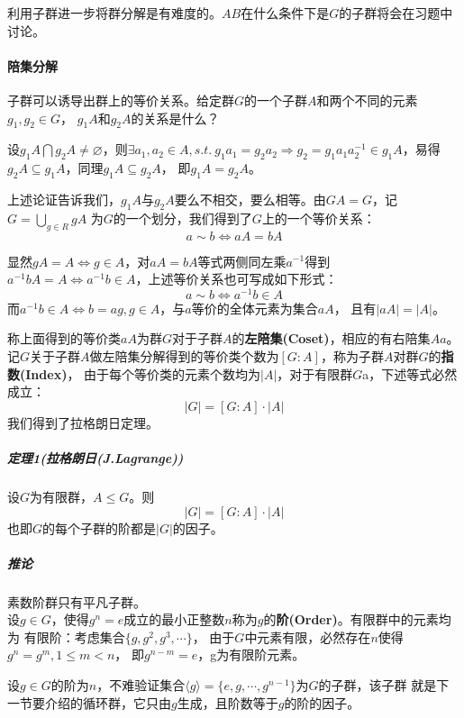 \documentclass{article}
\begin{document}
利用子群进一步将群分解是有难度的。$AB$在什么条件下是$G$的子群将会在习题中讨论。 

\paragraph{陪集分解} 子群可以诱导出群上的等价关系。给定群$G$的一个子群$A$和两个不同的元素$g_1,g_2 \in G$，
$g_1A$和$g_2A$的关系是什么？

设$g_1A \bigcap g_2A \neq \varnothing$，则$\exists a_1,a_2 \in A, s.t.\ g_1a_1=g_2a_2
\Rightarrow g_2=g_1a_1a_2^{-1} \in g_1A$，易得$g_2A \subseteq g_1A$，同理$g_1A \subseteq g_2A$，
即$g_1A=g_2A$。

上述论证告诉我们，$g_1A$与$g_2A$要么不相交，要么相等。由$GA=G$，记$G=\mathop{\bigcup}\limits_{g \in R}gA$
为$G$的一个划分，我们得到了$G$上的一个等价关系：
\begin{equation*}
    a \sim b \Leftrightarrow aA=bA
\end{equation*}

显然$gA=A \Leftrightarrow g \in A$，对$aA=bA$等式两侧同左乘$a^{-1}$得到
$a^{-1}bA=A \Leftrightarrow a^{-1}b \in A$，上述等价关系也可写成如下形式：
\begin{equation*}
    a \sim b \Leftrightarrow a^{-1}b \in A
\end{equation*}
而$a^{-1}b \in A \Leftrightarrow b=ag,g \in A$，与$a$等价的全体元素为集合$aA$，
且有$|aA|=|A|$。

称上面得到的等价类$aA$为群$G$对于子群$A$的\textbf{左陪集(Coset)}，相应的有右陪集$Aa$。
记$G$关于子群$A$做左陪集分解得到的等价类个数为$[G : A]$，称为子群$A$对群$G$的\textbf{指数(Index)}，
由于每个等价类的元素个数均为$|A|$，对于有限群$G$a，下述等式必然成立：
\begin{equation*}
    |G| = [G:A] \cdot |A|
\end{equation*}
我们得到了拉格朗日定理。
\subparagraph{定理1(拉格朗日(J.Lagrange))}设$G$为有限群，$A \leq G$。则
\begin{equation*}
    |G| = [G:A] \cdot |A|
\end{equation*}
也即$G$的每个子群的阶都是$|G|$的因子。

\subparagraph{推论} 素数阶群只有平凡子群。\\

设$g \in G$，使得$g^n=e$成立的最小正整数$n$称为$g$的\textbf{阶(Order)}。有限群中的元素均为
有限阶：考虑集合$\{ g, g^2,g^3, \cdots\}$， 由于$G$中元素有限，必然存在$n$使得$g^n=g^m,1 \leq m < n$，
即$g^{n-m}=e$，g为有限阶元素。

设$g \in G$的阶为$n$，不难验证集合$\langle g \rangle = \{ e,g,\cdots, g^{n-1}\}$为$G$的子群，该子群
就是下一节要介绍的循环群，它只由$g$生成，且阶数等于$g$的阶的因子。
\end{document}
